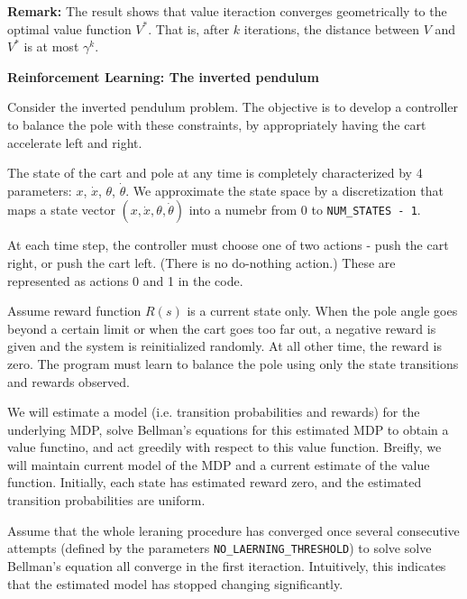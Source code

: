\documentclass[12pt,letterpaper,boxed]{hmcpset}
\begin{document}
\begin{remark}
  \textbf{Remark:} The result shows that value iteraction converges geometrically to the optimal value function $V^*$. That is, after $k$ iterations, the distance between $V$ and $V^*$ is at most $\gamma^k$.
\end{remark}

\newpage
\begin{problem}[Problem 6]
  \textbf{Reinforcement Learning: The inverted pendulum}

  Consider the inverted pendulum problem. The objective is to develop a controller to balance the pole with these constraints, by appropriately having the cart accelerate left and right.

  The state of the cart and pole at any time is completely characterized by 4 parameters: $x$, $\dot x$, $\theta$, $\dot \theta$. We approximate the state space by a discretization that maps a state vector $(x, \dot x, \theta, \dot \theta)$ into a numebr from $0$ to \verb|NUM_STATES - 1|. 

  At each time step, the controller must choose one of two actions - push the cart right, or push the cart left. (There is no do-nothing action.) These are represented as actions 0 and 1 in the code.

  Assume reward function $R(s)$ is a current state only. When the pole angle goes beyond a certain limit or when the cart goes too far out, a negative reward is given and the system is reinitialized randomly. At all other time, the reward is zero. The program must learn to balance the pole using only the state transitions and rewards observed.

  We will estimate a model (i.e. transition probabilities and rewards) for the underlying MDP, solve Bellman's equations for this estimated MDP to obtain a value functino, and act greedily with respect to this value function. Breifly, we will maintain current model of the MDP and a current estimate of the value function. Initially, each state has estimated reward zero, and the estimated transition probabilities are uniform.

  Assume that the whole leraning procedure has converged once several consecutive attempts (defined by the parameters \verb|NO_LAERNING_THRESHOLD|) to solve solve Bellman's equation all converge in the first iteraction. Intuitively, this indicates that the estimated model has stopped changing significantly.
\end{problem}
\end{document}
